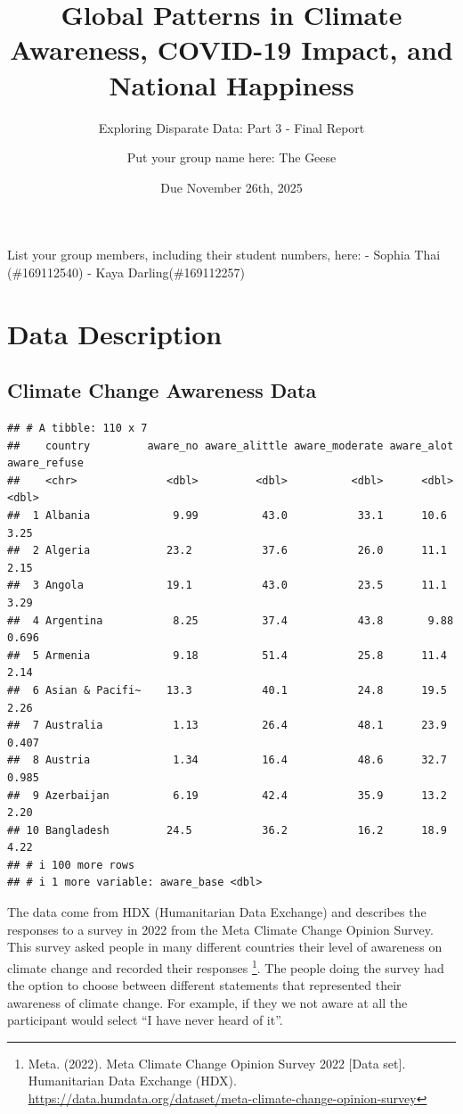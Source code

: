 \documentclass[
]{article}
\title{Global Patterns in Climate Awareness, COVID-19 Impact, and National Happiness}
\subtitle{Exploring Disparate Data: Part 3 - Final Report}
\author{Put your group name here: The Geese}
\date{Due November 26th, 2025}
\begin{document}
\maketitle

List your group members, including their student numbers, here:
- Sophia Thai (\#169112540)
- Kaya Darling(\#169112257)

\section{Data Description}\label{data-description}

\subsection{Climate Change Awareness Data}\label{climate-change-awareness-data}

\begin{verbatim}
## # A tibble: 110 x 7
##    country         aware_no aware_alittle aware_moderate aware_alot aware_refuse
##    <chr>              <dbl>         <dbl>          <dbl>      <dbl>        <dbl>
##  1 Albania             9.99          43.0           33.1      10.6         3.25 
##  2 Algeria            23.2           37.6           26.0      11.1         2.15 
##  3 Angola             19.1           43.0           23.5      11.1         3.29 
##  4 Argentina           8.25          37.4           43.8       9.88        0.696
##  5 Armenia             9.18          51.4           25.8      11.4         2.14 
##  6 Asian & Pacifi~    13.3           40.1           24.8      19.5         2.26 
##  7 Australia           1.13          26.4           48.1      23.9         0.407
##  8 Austria             1.34          16.4           48.6      32.7         0.985
##  9 Azerbaijan          6.19          42.4           35.9      13.2         2.20 
## 10 Bangladesh         24.5           36.2           16.2      18.9         4.22 
## # i 100 more rows
## # i 1 more variable: aware_base <dbl>
\end{verbatim}

The data come from HDX (Humanitarian Data Exchange) and describes the responses to a survey in 2022 from the Meta Climate Change Opinion Survey. This survey asked people in many different countries their level of awareness on climate change and recorded their responses \footnote{Meta. (2022). Meta Climate Change Opinion Survey 2022 {[}Data set{]}. Humanitarian Data Exchange (HDX). \url{https://data.humdata.org/dataset/meta-climate-change-opinion-survey}}. The people doing the survey had the option to choose between different statements that represented their awareness of climate change. For example, if they we not aware at all the participant would select ``I have never heard of it''.
\end{document}
